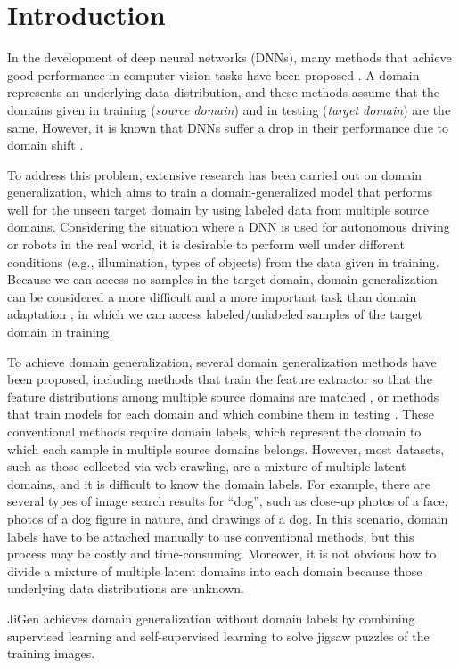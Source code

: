 \documentclass[letterpaper]{article} \usepackage{aaai20}  \usepackage{times}  \usepackage{helvet} \usepackage{courier}  \usepackage[hyphens]{url}  \usepackage{graphicx} \urlstyle{rm} \def\UrlFont{\rm}  \usepackage{graphicx}  \usepackage[whole]{bxcjkjatype}
\begin{document}
\section{Introduction}
In the development of deep neural networks (DNNs), many methods that achieve good performance in computer vision tasks have been proposed \cite{FasterRCNN,deeplab_v3+}.
A domain represents an underlying data distribution, and these methods assume that the domains given in training (\textit{source domain}) and in testing (\textit{target domain}) are the same. However, it is known that DNNs suffer a drop in their performance due to domain shift \cite{dataset_bias}.\par
To address this problem, extensive research has been carried out on domain generalization, which aims to train a domain-generalized model that performs well for the unseen target domain by using labeled data from multiple source domains. Considering the situation where a DNN is used for autonomous driving or robots in the real world, it is desirable to perform well under different conditions (e.g., illumination, types of objects) from the data given in training. 
Because we can access no samples in the target domain, domain generalization can be considered a more difficult and a more important task than domain adaptation \cite{DAN,GRL}, in which we can access labeled/unlabeled samples of the target domain in training.\par
To achieve domain generalization, several domain generalization methods have been proposed, including methods that train the feature extractor so that the feature distributions among multiple source domains are matched \cite{MMD_AAE,CIDDG}, or methods that train models for each domain and which combine them in testing \cite{SSN,D_SAM}.
These conventional methods require domain labels, which represent the domain to which each sample in multiple source domains belongs.
However, most datasets, such as those collected via web crawling, are a mixture of multiple latent domains, and it is difficult to know the domain labels. For example, there are several types of image search results for ``dog'', such as close-up photos of a face, photos of a dog figure in nature, and drawings of a dog. In this scenario, domain labels have to be attached manually to use conventional methods, but this process may be costly and time-consuming. Moreover, it is not obvious how to divide a mixture of multiple latent domains into each domain because those underlying data distributions are unknown.\par
JiGen \cite{JiGen} achieves domain generalization without domain labels by combining supervised learning and self-supervised learning to solve jigsaw puzzles of the training images. 
\end{document}
